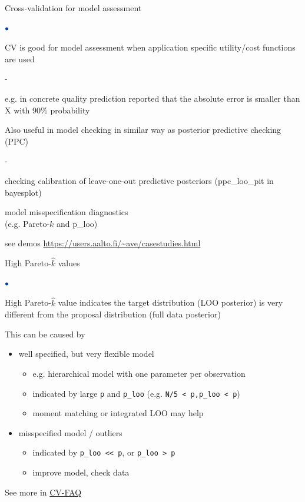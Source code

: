 \documentclass[english,t]{beamer}
\newenvironment{list1}{
   \begin{list}{$\color{list1}\bullet$}{\itemsep=6pt}}{
  \end{list}}
\newenvironment{list2}{
  \begin{list}{-}{\baselineskip=12pt\itemsep=2pt}}{
  \end{list}}
\begin{document}
\begin{frame}{Cross-validation for model assessment}

\begin{list1}
\item CV is good for model assessment when application specific utility/cost functions are used
  \begin{list2}
  \item e.g. in concrete quality prediction reported that the absolute
    error is smaller than X with 90\% probability
  \end{list2}
\item<2-> Also useful in model checking in similar way as posterior
  predictive checking (PPC)
  \begin{list2}
  \item checking calibration of leave-one-out predictive posteriors
    (ppc\_loo\_pit in bayesplot)
  \item model misspecification diagnostics\\ (e.g. Pareto-$k$ and p\_loo)
  \end{list2}
  {\small see demos \url{https://users.aalto.fi/~ave/casestudies.html}}
\end{list1}

\end{frame}

\begin{frame}{High Pareto-$\hat{k}$ values}

\begin{list1}
\item<+-> High Pareto-$\hat{k}$ value indicates the target distribution
  (LOO posterior) is very different from the proposal distribution
  (full data posterior)
\item<+-> This can be caused by
  \begin{itemize}
  \item well specified, but very flexible model
    \begin{itemize}
    \item e.g. hierarchical model with one parameter per observation
    \item indicated by large \texttt{p} and \texttt{p\_loo} (e.g. \texttt{N/5 < p,p\_loo < p})
    \item moment matching or integrated LOO may help
    \end{itemize}
  \item<+-> misspecified model / outliers
    \begin{itemize}
    \item indicated by \texttt{p\_loo {<}< p}, or \texttt{p\_loo > p}
    \item improve model, check data
    \end{itemize}
  \end{itemize}
\item<+-> See more in \href{https://users.aalto.fi/~ave/modelselection/CV-FAQ.html}{CV-FAQ}

\end{list1}

\end{frame}
\end{document}
